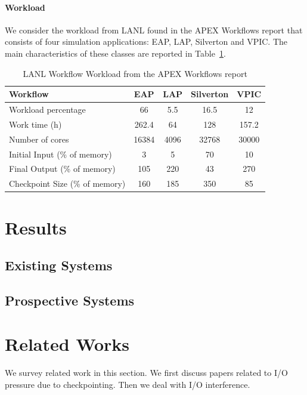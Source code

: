 \documentclass[conference]{IEEEtran}
\begin{document}
\paragraph*{Workload} We consider the workload from LANL found
in the APEX Workflows report that consists of four simulation
applications: EAP, LAP, Silverton and VPIC. The main characteristics
of these classes are reported in Table~\ref{table:lanl}.

\begin{table}
\begin{tabular}{|l|c|c|c|c|}
\hline
 Workflow & EAP & LAP & Silverton & VPIC \\\hline
Workload percentage & 66 & 5.5 & 16.5 & 12 \\\hline
Work time (h) & 262.4 & 64 & 128 & 157.2 \\\hline
Number of cores & 16384 & 4096 & 32768 & 30000 \\\hline
Initial Input (\% of memory) &  3 & 5 & 70 & 10 \\\hline
Final Output (\% of memory) & 105 & 220 & 43 & 270 \\\hline
Checkpoint Size (\% of memory) & 160 & 185 & 350 & 85 \\\hline
\end{tabular}
\caption{LANL Workflow Workload from the APEX Workflows report\label{table:lanl}}
\end{table}

\section{Results}\label{sec:results}

\subsection{Existing Systems}

\subsection{Prospective Systems}


\section{Related Works}\label{sec:related}

We survey related work in this section. We first discuss papers related to I/O pressure
due to checkpointing. Then we deal with I/O interference.
\end{document}
